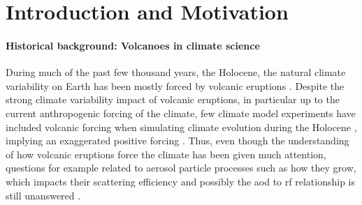 \documentclass{ametsocV5}
\begin{document}

\section{Introduction and Motivation}


\paragraph*{Historical background: Volcanoes in climate science}

During much of the past few thousand years, the Holocene, the natural climate
variability on Earth has been mostly forced by volcanic eruptions \citep{sigl2022}.
Despite the strong climate variability impact of volcanic eruptions, in particular up to
the current anthropogenic forcing of the climate, few climate model experiments have
included volcanic forcing when simulating climate evolution during the Holocene
\citep{sigl2022}, implying an exaggerated positive forcing \citep{gregory2016}. Thus,
even though the understanding of how volcanic eruptions force the climate has been given
much attention, questions for example related to aerosol particle processes such as how
they grow, which impacts their scattering efficiency and possibly the \ac{aod} to
\ac{rf} relationship is still unanswered
\citep[e.g.][]{robock2000,zanchettin2019,marshall2020,marshall2022}.
\end{document}

